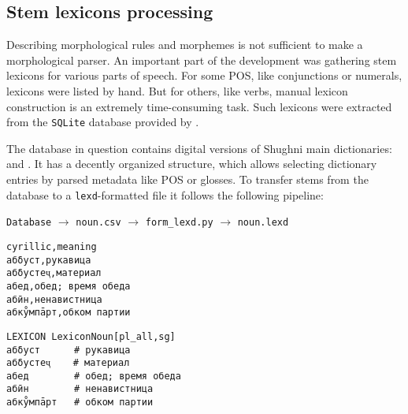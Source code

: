 \subsection{Stem lexicons processing} \label{stem_lexicons}
Describing morphological rules and morphemes is not sufficient to make a morphological parser. An important part of the development was gathering stem lexicons for various parts of speech. For some POS, like conjunctions or numerals, lexicons were listed by hand. But for others, like verbs, manual lexicon construction is an extremely time-consuming task. Such lexicons were extracted from the \texttt{SQLite} database provided by \textcite{makarov_digital_2022}. 

The database in question contains digital versions of Shughni main dictionaries: \textcite{karamshoev_dict_1988} and \textcite{zarubin_dict_1960}. It has a decently organized structure, which allows selecting dictionary entries by parsed metadata like POS or glosses. To transfer stems from the database to a \texttt{lexd}-formatted file it follows the following pipeline:

\begin{center}
    \texttt{Database} $\rightarrow$ \texttt{noun.csv} $\rightarrow$ \texttt{form\_lexd.py} $\rightarrow$ \texttt{noun.lexd}
\end{center}

\begin{code_frame}[float]
    \begin{subbox}[title={Exported \texttt{noun.csv} fragment}]
        \begin{footnotesize}
        \begin{verbatim}
cyrillic,meaning
абδуст,рукавица
абδустеҷ,материал
абед,обед; время обеда
абӣн,ненавистница
абку̊мпāрт,обком партии
        \end{verbatim}
        \end{footnotesize}
    \end{subbox}
    \begin{subbox}[title={Generated \texttt{noun.lexd} fragment}]
        \begin{footnotesize}
        \begin{verbatim}
LEXICON LexiconNoun[pl_all,sg]
абδуст      # рукавица
абδустеҷ    # материал
абед        # обед; время обеда
абӣн        # ненавистница
абку̊мпāрт   # обком партии
        \end{verbatim}
        \end{footnotesize}
    \end{subbox}
    \tcblower
    \label{code:6_1}
\end{code_frame}

